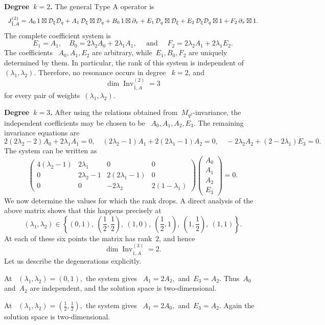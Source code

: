 \documentclass[12pt,a4paper]{amsart}
\theoremstyle{thm}
\theoremstyle{definition}
\newcommand {\Dq}{\cD_q}
\newcommand {\Dxi}{\cD_\xi}
\begin{document}
{\bf Degree~\(k=2\).} The general Type A operator is
\[
\begin{array}{r@{}l}
J_{\bar1,A}^{(2)}
={}&
A_0\,1\boxtimes \Dxi\Dq
+
A_1\,\Dxi\boxtimes \Dq
+
B_0\,1\boxtimes \partial_\tau
+
E_1\,\Dq\boxtimes \Dxi
+
E_2\,\Dxi\Dq\boxtimes1
+
F_2\,\partial_\tau\boxtimes1.
\end{array}
\]
The complete coefficient system is
\[ E_1=A_1, \quad
B_0=2\lambda_2A_0+2\lambda_1A_1, \quad \text{ and }\quad
F_2=2\lambda_2A_1+2\lambda_1E_2.
\]
The coefficients~%
$
A_0, A_1, E_2
$  are arbitrary, while~\(E_1,B_0,F_2\) are uniquely determined by them.
In particular, the rank of this system is independent of~%
\((\lambda_1,\lambda_2)\). Therefore, no resonance occurs in degree~%
\(k=2\), and
\[
\dim\operatorname{Inv}_{\bar1,A}^{(2)}=3
\]
for every pair of weights~\((\lambda_1,\lambda_2)\).

{\bf Degree~\(k=3\).} After using the relations obtained from~\(M_{q^2}\)-invariance, the
independent coefficients may be chosen to be~%
$
A_0, A_1, A_2, E_3.$
The remaining invariance equations are
\[
2(2\lambda_2-2)A_0
+
2\lambda_1A_1
=
0, \quad (2\lambda_2-1)A_1
+
2(2\lambda_1-1)A_2
=
0,
\quad
-2\lambda_2A_2
+
(2-2\lambda_1)E_3
=
0.
\]
The system can be written as
\[
\begin{pmatrix}
4(\lambda_2-1) & 2 \lambda_1 & 0 & 0\\
0 & 2\lambda_2-1 & 2(2 \lambda_1-1) & 0\\
0 & 0 & - 2 \lambda_2 & 2(1-\lambda_1)
\end{pmatrix}
\begin{pmatrix}
A_0\\
A_1\\
A_2\\
E_3
\end{pmatrix}
=0.
\]
We now determine the values for which the rank drops. A direct
analysis of the above matrix shows that this happens precisely at
\[
(\lambda_1,\lambda_2)
\in
\left\{
(0,1),\
\left(\frac12,\frac12\right),\
(1,0),\
\left(\frac12,1\right),\
\left(1,\frac12\right),\
(1,1)
\right\}.
\]
At each of these six points the matrix has rank~\(2\), and hence
\[
\dim\operatorname{Inv}_{\bar1,A}^{(3)}=2.
\]
Let us describe the degenerations explicitly.

At~%
$
(\lambda_1,\lambda_2)=(0,1),
$ the system gives~%
$
A_1=2A_2,$ and~$E_3=A_2.
$
Thus~\(A_0\) and~\(A_2\) are independent, and the solution space is two-dimensional.

At~%
$
(\lambda_1,\lambda_2)
=
\left(\frac12,\frac12\right),$ the system gives~%
$
A_1=2A_0,
$ and~$
E_3=A_2.
$
Again the solution space is two-dimensional.
\end{document}

